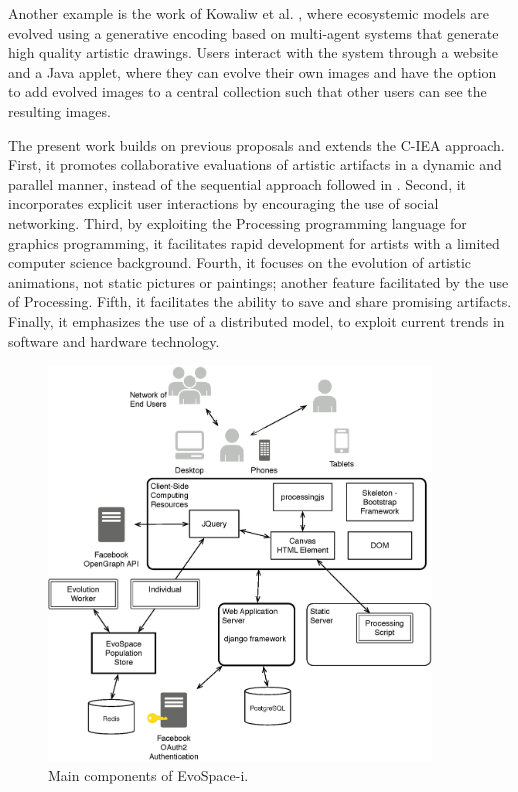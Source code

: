 \documentclass{sig-alternate}
\begin{document}
Another example is the work of Kowaliw et al. \cite{evoeco}, where ecosystemic models are evolved using a generative encoding based on multi-agent systems
that generate high quality artistic drawings.
Users interact with the system through a website and a Java applet, where they can evolve their own images and have the option
to add evolved images to a central collection such that other users can see the resulting images.


The present work builds on previous proposals and extends the C-IEA approach.
First, it promotes collaborative evaluations of artistic artifacts in a dynamic and parallel manner,
instead of the sequential approach followed in \cite{picbreeder,forms}.
Second, it incorporates explicit user interactions by encouraging the use of social networking.
Third, by exploiting the Processing programming language for graphics programming, it facilitates rapid development for artists
with a limited computer science background.
Fourth, it focuses on the evolution of artistic animations, not static pictures or paintings; another feature facilitated by the use of Processing.
Fifth, it facilitates the ability to save and share promising artifacts.
Finally, it emphasizes the use of a distributed model, to exploit current trends in software and hardware technology.

\begin{figure}[!t]
    \centering
        \includegraphics[width=4in]{Architecture.eps}
    \caption{Main components of EvoSpace-i.}
    \label{fig:arch}
\end{figure}
\end{document}
